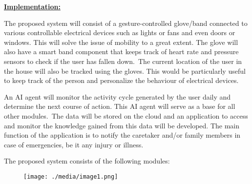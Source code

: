 \documentclass[12pt]{article}
\begin{document}
\vspace{\baselineskip}
{\fontsize{14pt}{16.8pt}\selectfont \textbf{\uline{Implementation:}}\par}\par

\begin{justify}
The proposed system will consist of a gesture-controlled glove/band connected to various controllable electrical devices such as lights or fans and even doors or windows. This will solve the issue of mobility to a great extent. The glove will also have a smart band component that keeps track of heart rate and pressure sensors to check if the user has fallen down. The current location of the user in the house will also be tracked using the gloves. This would be particularly useful\textbf{ }to keep track of the person and personalize the behaviour of electrical devices.
\end{justify}\par

\begin{justify}
An AI agent will monitor the activity cycle generated by the user daily and determine the next course of action. This AI agent will serve as a base for all other modules. The data will be stored on the cloud and an application to access and monitor the knowledge gained from this data will be developed. The main function of the application is to notify the caretaker and/or family members in case of emergencies, be it any injury or illness.
\end{justify}\par

\begin{justify}
The proposed system consists of the following modules:
\end{justify}\par




\begin{figure}[H]
	\begin{Center}
		\texttt{[image: ./media/image1.png]}
	\end{Center}
\end{figure}



\par
\end{document}
